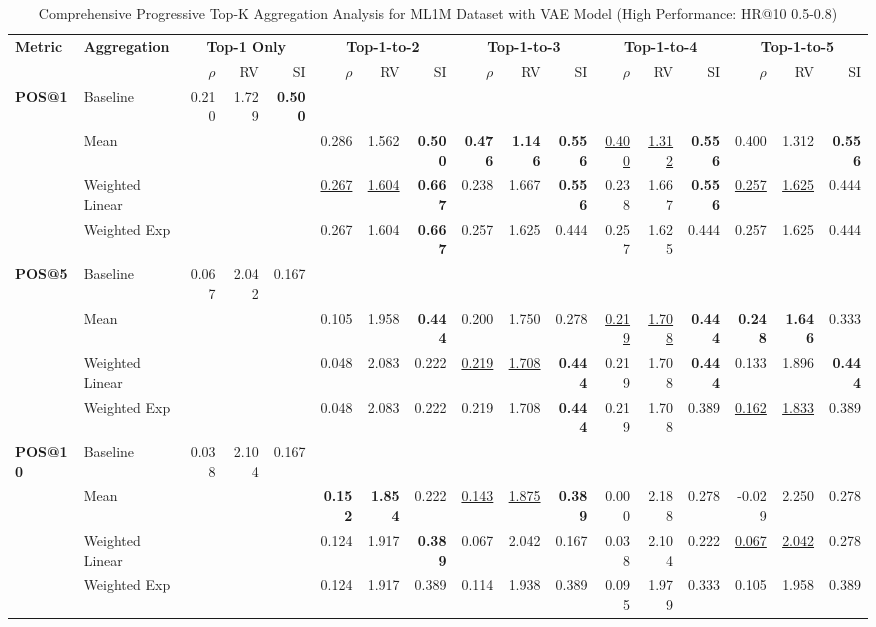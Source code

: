 \documentclass{article}
\begin{document}
\begin{table}[htbp]
\centering
\caption{Comprehensive Progressive Top-K Aggregation Analysis for ML1M Dataset with VAE Model (High Performance: HR@10 0.5-0.8)}
\label{tab:ml1m_vae_progressive_topk_comprehensive_highperf}
\scriptsize
\begin{tabular}{@{}llrrr|rrr|rrr|rrr|rrr@{}}
\toprule
\multirow{2}{*}{\textbf{Metric}} & \multirow{2}{*}{\textbf{Aggregation}} & \multicolumn{3}{c|}{\textbf{Top-1 Only}} & \multicolumn{3}{c|}{\textbf{Top-1-to-2}} & \multicolumn{3}{c|}{\textbf{Top-1-to-3}} & \multicolumn{3}{c|}{\textbf{Top-1-to-4}} & \multicolumn{3}{c}{\textbf{Top-1-to-5}} \\
\cmidrule(lr){3-5} \cmidrule(lr){6-8} \cmidrule(lr){9-11} \cmidrule(lr){12-14} \cmidrule(lr){15-17}
& & $\rho$ & RV & SI & $\rho$ & RV & SI & $\rho$ & RV & SI & $\rho$ & RV & SI & $\rho$ & RV & SI \\
\midrule

\multirow{4}{*}{\textbf{POS@1}} 
& Baseline & 0.210 & 1.729 & \textbf{0.500} & & & & & & & & & & & & \\
& Mean & & & & 0.286 & 1.562 & \textbf{0.500} & \textbf{0.476} & \textbf{1.146} & \textbf{0.556} & \uline{0.400} & \uline{1.312} & \textbf{0.556} & 0.400 & 1.312 & \textbf{0.556} \\
& Weighted Linear & & & & \uline{0.267} & \uline{1.604} & \textbf{0.667} & 0.238 & 1.667 & \textbf{0.556} & 0.238 & 1.667 & \textbf{0.556} & \uline{0.257} & \uline{1.625} & 0.444 \\
& Weighted Exp & & & & 0.267 & 1.604 & \textbf{0.667} & 0.257 & 1.625 & 0.444 & 0.257 & 1.625 & 0.444 & 0.257 & 1.625 & 0.444 \\
\midrule

\multirow{4}{*}{\textbf{POS@5}} 
& Baseline & 0.067 & 2.042 & 0.167 & & & & & & & & & & & & \\
& Mean & & & & 0.105 & 1.958 & \textbf{0.444} & 0.200 & 1.750 & 0.278 & \uline{0.219} & \uline{1.708} & \textbf{0.444} & \textbf{0.248} & \textbf{1.646} & 0.333 \\
& Weighted Linear & & & & 0.048 & 2.083 & 0.222 & \uline{0.219} & \uline{1.708} & \textbf{0.444} & 0.219 & 1.708 & \textbf{0.444} & 0.133 & 1.896 & \textbf{0.444} \\
& Weighted Exp & & & & 0.048 & 2.083 & 0.222 & 0.219 & 1.708 & \textbf{0.444} & 0.219 & 1.708 & 0.389 & \uline{0.162} & \uline{1.833} & 0.389 \\
\midrule

\multirow{4}{*}{\textbf{POS@10}} 
& Baseline & 0.038 & 2.104 & 0.167 & & & & & & & & & & & & \\
& Mean & & & & \textbf{0.152} & \textbf{1.854} & 0.222 & \uline{0.143} & \uline{1.875} & \textbf{0.389} & 0.000 & 2.188 & 0.278 & -0.029 & 2.250 & 0.278 \\
& Weighted Linear & & & & 0.124 & 1.917 & \textbf{0.389} & 0.067 & 2.042 & 0.167 & 0.038 & 2.104 & 0.222 & \uline{0.067} & \uline{2.042} & 0.278 \\
& Weighted Exp & & & & 0.124 & 1.917 & 0.389 & 0.114 & 1.938 & 0.389 & 0.095 & 1.979 & 0.333 & 0.105 & 1.958 & 0.389 \\
\midrule


\end{tabular}
\end{table}
\end{document}

